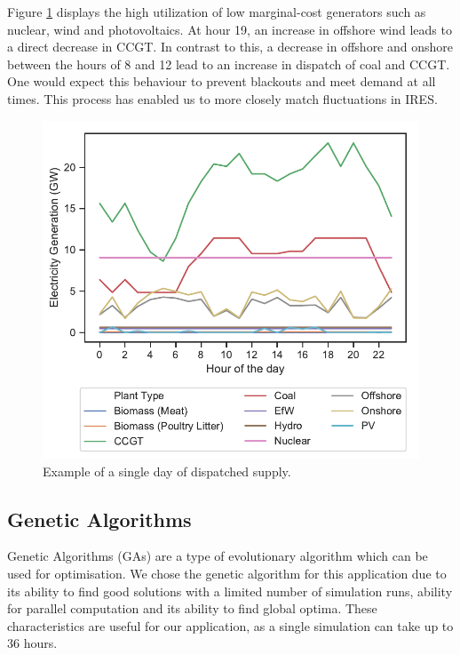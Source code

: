 Figure \ref{fig:single_dispatched_day} displays the high utilization of low marginal-cost generators such as nuclear, wind and photovoltaics. At hour 19, an increase in offshore wind leads to a direct decrease in CCGT. In contrast to this, a decrease in offshore and onshore between the hours of 8 and 12 lead to an increase in dispatch of coal and CCGT. One would expect this behaviour to prevent blackouts and meet demand at all times. This process has enabled us to more closely match fluctuations in IRES.

\begin{figure}
	\centering
	\includegraphics[width=\textwidth]{Chapter4/figures/e-Energy-2020/methods_and_materials/clusters_results_single_day.pdf}
	\caption{Example of a single day of dispatched supply.}
	\label{fig:single_dispatched_day}
\end{figure}





\subsection{Genetic Algorithms}

Genetic Algorithms (GAs) are a type of evolutionary algorithm which can be used for optimisation. We chose the genetic algorithm for this application due to its ability to find good solutions with a limited number of simulation runs, ability for parallel computation and its ability to find global optima. These characteristics are useful for our application, as a single simulation can take up to 36 hours. 

